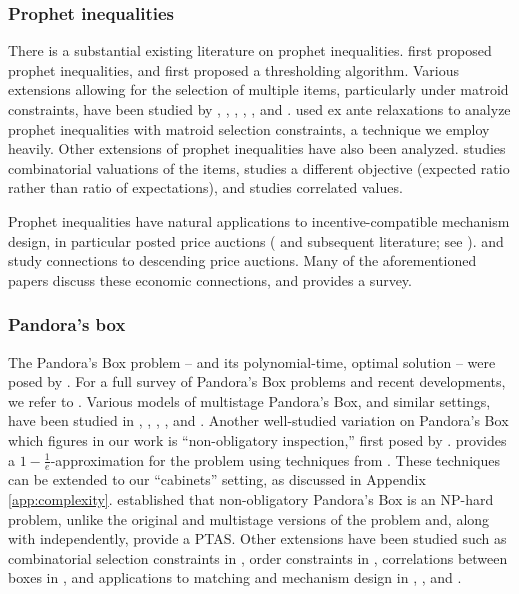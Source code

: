 \subsubsection{Prophet inequalities}
There is a substantial existing literature on prophet inequalities.
\citet{krengel1978semiamarts} first proposed prophet inequalities, and \citet{samuelcahn1984comparison} first proposed a thresholding algorithm.
Various extensions allowing for the selection of multiple items, particularly under matroid constraints, have been studied by  \citet{chawla2010multi}, \citet{yan2011mechanism}, \citet{kleinberg2012matroid}, \citet{feldman2016online}, \citet{dutting2020prophet}, and \citet{chawla2024non}.
\citet{lee2018optimal} used ex ante relaxations to analyze prophet inequalities with matroid selection constraints, a technique we employ heavily.
Other extensions of prophet inequalities have also been analyzed.
\citet{rubinstein2017combinatorial} studies combinatorial valuations of the items, \citet{ezra2023prophet} studies a different objective (expected ratio rather than ratio of expectations), and \citet{immorlica2020prophet} studies correlated values.

Prophet inequalities have natural applications to incentive-compatible mechanism design, in particular posted price auctions (\citet{chawla2010multi} and subsequent literature; see \citet{lucier2017economic}).
\citet{alaei2022descending} and \citet{kleinberg2016descending} study connections to descending price auctions.
Many of the aforementioned papers discuss these economic connections, and \citet{lucier2017economic} provides a survey.

\subsubsection{Pandora's box}
The Pandora's Box problem -- and its polynomial-time, optimal solution -- were posed by \citet{weitzman1979optimal}.
For a full survey of Pandora's Box problems and recent developments, we refer to \citet{beyhaghi2024recent}.
Various models of multistage Pandora's Box, and similar settings, have been studied in \citet{guha2007information}, \citet{aouad2020pandora}, \citet{gupta2019markovian}, \citet{ke2019optimal}, and \citet{bowers2024matching}.
Another well-studied variation on Pandora's Box which figures in our work is ``non-obligatory inspection,'' first posed by \citet{doval2018whether}. \citet{beyhaghi2019pandora} provides a $1-\frac{1}{e}$-approximation for the problem
using techniques from \citet{asadpour2016maximizing}.
These techniques can be extended to our ``cabinets'' setting, as discussed in Appendix \ref{app:complexity}.
\citet{fu2023pandora} established that non-obligatory Pandora's Box is an NP-hard problem, unlike the original and multistage versions of the problem and, along with \citet{beyhaghi2023pandora} independently, provide a PTAS.
Other extensions have been studied such as combinatorial selection constraints in \citet{singla2018price}, order constraints in \citet{boodaghians2020pandora}, correlations between boxes in \citet{chawla2020pandoras}, and applications to matching and mechanism design in \citet{immorlica2020information},  \citet{bowers2023high}, and \citet{bowers2024matching}.

